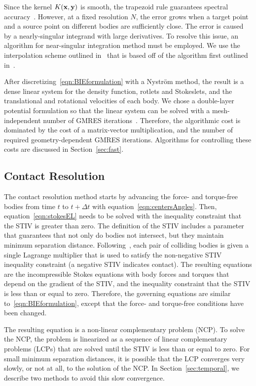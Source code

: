 \documentclass[AMA,STIX1COL]{WileyNJD-v2}
\begin{document}
Since the kernel $K({\mathbf{x}},{\mathbf{y}})$ is smooth, the trapezoid rule guarantees
spectral accuracy~\cite{Trefethan2014}.  However, at a fixed resolution
$N$, the error grows when a target point and a source point on different
bodies are sufficiently close.  The error is caused by a nearly-singular
integrand with large derivatives.  To resolve this issue, an algorithm
for near-singular integration method must be employed.  We use the
interpolation scheme outlined in~\cite{Quaife2014} that is based off of
the algorithm first outlined in~\cite{Ying2006}.
  
After discretizing~\eqref{eqn:BIEformulation} with a Nystr\"om method,
the result is a dense linear system for the density function, rotlets
and Stokeslets, and the translational and rotational velocities of each
body.  We chose a double-layer potential formulation so that the linear
system can be solved with a mesh-independent number of GMRES
iterations~\cite{Campbell1996}.  Therefore, the algorithmic cost is
dominated by the cost of a matrix-vector multiplication, and the number
of required geometry-dependent GMRES iterations.  Algorithms for
controlling these costs are discussed in Section~\ref{sec:fast}.

\subsection{Contact Resolution}
\label{sec:contact}
The contact resolution method starts by advancing the force- and
torque-free bodies from time $t$ to $t + \Delta t$ with
equation~\eqref{eqn:centersAngles}.  Then, equation~\eqref{eqn:stokesEL}
needs to be solved with the inequality constraint that the STIV is
greater than zero.  The definition of the STIV includes a parameter that
guarantees that not only do bodies not intersect, but they maintain
minimum separation distance. Following~\cite{Lu2017}, each pair of
colliding bodies is given a single Lagrange multiplier that is used to
satisfy the non-negative STIV inequality constraint (a negative STIV
indicates contact).  The resulting equations are the incompressible
Stokes equations with body forces and torques that depend on the
gradient of the STIV, and the inequality constraint that the STIV is
less than or equal to zero.  Therefore, the governing equations are
similar to~\eqref{eqn:BIEformulation}, except that the force- and
torque-free conditions have been changed.

The resulting equation is a non-linear complementary problem (NCP). To
solve the NCP, the problem is linearized as a sequence of linear
complementary problems (LCPs) that are solved until the STIV is less
than or equal to zero.  For small minimum separation distances, it is
possible that the LCP converges very slowly, or not at all, to the
solution of the NCP.  In Section~\ref{sec:temporal}, we describe two
methods to avoid this slow convergence.
\end{document}
